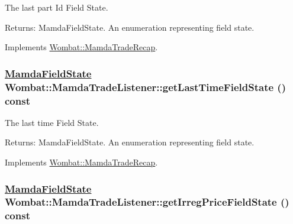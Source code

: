 The last part Id Field State. 

\begin{Desc}
\item[Returns:]Mamda\-Field\-State. An enumeration representing field state. \end{Desc}


Implements \hyperlink{classWombat_1_1MamdaTradeRecap_a2b712b3f95d4613d5a1c98c61b00902}{Wombat::Mamda\-Trade\-Recap}.\hypertarget{classWombat_1_1MamdaTradeListener_3949dbc87861899ae66b1ee7173011b4}{
\subsubsection[getLastTimeFieldState]{\setlength{\rightskip}{0pt plus 5cm}\hyperlink{namespaceWombat_93aac974f2ab713554fd12a1fa3b7d2a}{Mamda\-Field\-State} Wombat::Mamda\-Trade\-Listener::get\-Last\-Time\-Field\-State () const}}
\label{classWombat_1_1MamdaTradeListener_3949dbc87861899ae66b1ee7173011b4}


The last time Field State. 

\begin{Desc}
\item[Returns:]Mamda\-Field\-State. An enumeration representing field state. \end{Desc}


Implements \hyperlink{classWombat_1_1MamdaTradeRecap_cb3823e27dc163ff09b61e8a41ff960f}{Wombat::Mamda\-Trade\-Recap}.\hypertarget{classWombat_1_1MamdaTradeListener_5c3e195cc4c8d41f3a56e9c9a39730dd}{
\subsubsection[getIrregPriceFieldState]{\setlength{\rightskip}{0pt plus 5cm}\hyperlink{namespaceWombat_93aac974f2ab713554fd12a1fa3b7d2a}{Mamda\-Field\-State} Wombat::Mamda\-Trade\-Listener::get\-Irreg\-Price\-Field\-State () const}}
\label{classWombat_1_1MamdaTradeListener_5c3e195cc4c8d41f3a56e9c9a39730dd}


